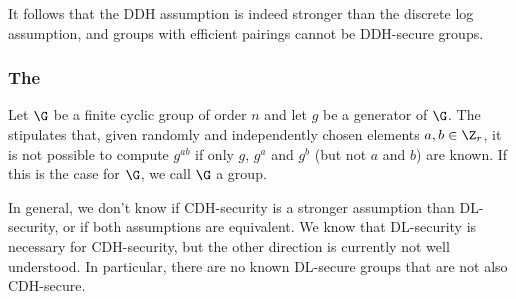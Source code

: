 It follows that the DDH assumption is indeed stronger than the discrete log assumption, and groups with efficient pairings cannot be DDH-secure groups. %

\begin{comment}
\begin{example}

Let $p$ be a prime number and $\F_p^*=\{1,2,\ldots,p-1\}$ the multiplicative group of modular $p$ arithmetics as in exercise \ref{ex:Zn*}. To see that $\F_p^*$ cannot be a DDH-secure group, recall from XXX that the \uterm{Legendre symbol} $\legsym{x}{p}$ of any $x\in \F_p^*$ is efficiently computable by \uterm{Euler's formular}.\sme{These are only explained later in the text, `\ref{eq: Legendre-symbol}`} But the  Legendre symbol of $g^{a}$ reveals whether $a$ is even or odd. Given $g^{a}$, $g^{b}$ and $g^{ab}$, one can thus efficiently compute and compare the least significant bit of $a$, $b$ and $a b$, respectively, which provides a probabilistic method to distinguish $g^{ab}$ from a random group element $g^c$.

\end{example}
\end{comment}

\subsubsection{The }
%
\begin{definition}
Let $\G$ be a finite cyclic group of order $n$ and let $g$ be a generator of $\G$. The  stipulates that, given randomly and independently  chosen elements $a,b\in\Z_r$, it is not possible to compute $g^{ab}$ if only $g$, $g^a$ and $g^b$ (but not $a$ and $b$) are known. If this is the case for $\G$, we call $\G$ a  group.
\end{definition}

In general, we don't know if CDH-security is a stronger assumption than DL-security, or if both assumptions are equivalent. We know that DL-security is necessary for CDH-security, but the other direction is currently not well understood. In particular, there are no known DL-secure groups  that are not also CDH-secure. %

